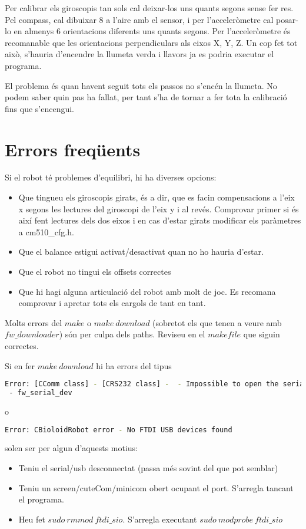 \documentclass{article}
\begin{document}
Per calibrar els giroscopis tan sols cal deixar-los uns quants segons sense fer res. Pel compass, cal dibuixar 8 a l'aire amb el sensor, i per l'acceleròmetre cal posar-lo en almenys 6 orientacions diferents uns quants segons. Per l'acceleròmetre és recomanable que les orientacions perpendiculars als eixos X, Y, Z. Un cop fet tot això, s'hauria d'encendre la llumeta verda i llavors ja es podria executar el programa.

El problema és quan havent seguit tots els passos no s'encén la llumeta. No podem saber quin pas ha fallat, per tant s'ha de tornar a fer tota la calibració fins que s'encengui.

\section{Errors freqüents}
Si el robot té problemes d'equilibri, hi ha diverses opcions:
\begin{itemize}
	\item Que tingueu els giroscopis girats, és a dir, que es facin compensacions a l'eix x segons les lectures del giroscopi de l'eix y i al revés. Comprovar primer si és així fent lectures dels dos eixos i en cas d'estar girats modificar els paràmetres a cm510\_cfg.h.
	\item Que el balance estigui activat/desactivat quan no ho hauria d'estar.
	\item Que el robot no tingui els offsets correctes
	\item Que hi hagi alguna articulació del robot amb molt de joc. Es recomana comprovar i apretar tots els cargols de tant en tant.
\end{itemize}

Molts errors del $make$ o $make\ download$ (sobretot els que tenen a veure amb $fw\_downloader$) són per culpa dels paths. Reviseu en el $makefile$ que siguin correctes. 

Si en fer $make\ download$ hi ha errors del tipus
\begin{lstlisting}[language=bash]
Error: [CComm class] - [CRS232 class] -  - Impossible to open the serial port.
 - fw_serial_dev
\end{lstlisting} 
o
\begin{lstlisting}[language=bash]
Error: CBioloidRobot error - No FTDI USB devices found
\end{lstlisting} 
solen ser per algun d'aquests motius:
\begin{itemize}
	\item Teniu el serial/usb desconnectat (passa més sovint del que pot semblar)
	\item Teniu un screen/cuteCom/minicom obert ocupant el port. S'arregla tancant el programa.
	\item Heu fet $sudo\ rmmod\ ftdi\_sio$. S'arregla executant $sudo\ modprobe\ ftdi\_sio$
	\end{itemize}
\end{document}
